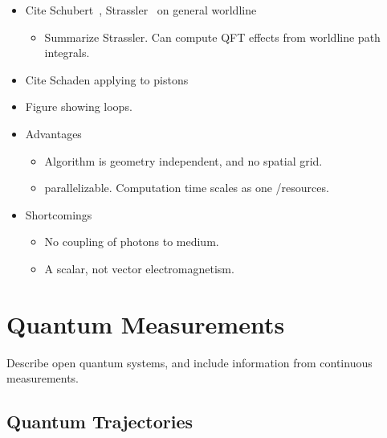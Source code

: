 \begin{itemize}
\item Cite Schubert~\cite{Schubert2001}, Strassler~\cite{Strassler1992} on general worldline
\begin{itemize}
\item Summarize Strassler.  Can compute QFT effects from worldline path integrals.  
\end{itemize}

\item Cite Schaden applying to pistons\cite{Schaden2009}
\item Figure showing loops.  
\item Advantages
  \begin{itemize}
  \item Algorithm is geometry independent, and no spatial grid.
  \item parallelizable.  Computation time scales as one /resources.  
  \end{itemize}

\item Shortcomings
\begin{itemize}
  \item No coupling of photons to medium.
  \item A scalar, not vector electromagnetism.
\end{itemize}
  
\end{itemize}

\section{Quantum Measurements}

Describe open quantum systems, and include information from continuous measurements. 

\subsection{Quantum Trajectories}


